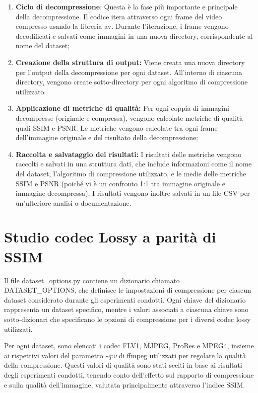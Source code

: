 \begin{enumerate}
    \item \textbf{Ciclo di decompressione}: Questa è la fase più importante e principale della decompressione. Il codice itera attraverso ogni frame del video compresso usando la libreria av. Durante l'iterazione, i frame vengono decodificati e salvati come immagini in una nuova directory, corrispondente al nome del dataset;
    \item \textbf{Creazione della struttura di output:} Viene creata una nuova directory per l'output della decompressione per ogni dataset. All'interno di ciascuna directory, vengono create sotto-directory per ogni algoritmo di compressione utilizzato.
    \item \textbf{Applicazione di metriche di qualità:} Per ogni coppia di immagini decompresse (originale e compressa), vengono calcolate metriche di qualità quali SSIM e PSNR. Le metriche vengono calcolate tra ogni frame dell'immagine originale e del risultato della decompressione;
    \item \textbf{Raccolta e salvataggio dei risultati:} I risultati delle metriche vengono raccolti e salvati in una struttura dati, che include informazioni come il nome del dataset, l'algoritmo di compressione utilizzato, e le medie delle metriche SSIM e PSNR (poiché vi è un confronto 1:1 tra immagine originale e immagine decompressa). I risultati vengono inoltre salvati in un file CSV per un'ulteriore analisi o documentazione.

\end{enumerate}

\section{Studio codec Lossy a parità di SSIM}

Il file dataset\_options.py contiene un dizionario chiamato DATASET\_OPTIONS, che definisce le impostazioni di compressione per ciascun dataset considerato durante gli esperimenti condotti. Ogni chiave del dizionario rappresenta un dataset specifico, mentre i valori associati a ciascuna chiave sono sotto-dizionari che specificano le opzioni di compressione per i diversi codec lossy utilizzati.

Per ogni dataset, sono elencati i codec FLV1, MJPEG, ProRes e MPEG4, insieme ai rispettivi valori del parametro \textit{-q:v}\cite{ffmpeg} di ffmpeg utilizzati per regolare la qualità della compressione. Questi valori di qualità sono stati scelti in base ai risultati degli esperimenti condotti, tenendo conto dell'effetto sul rapporto di compressione e sulla qualità dell'immagine, valutata principalmente attraverso l'indice SSIM.

